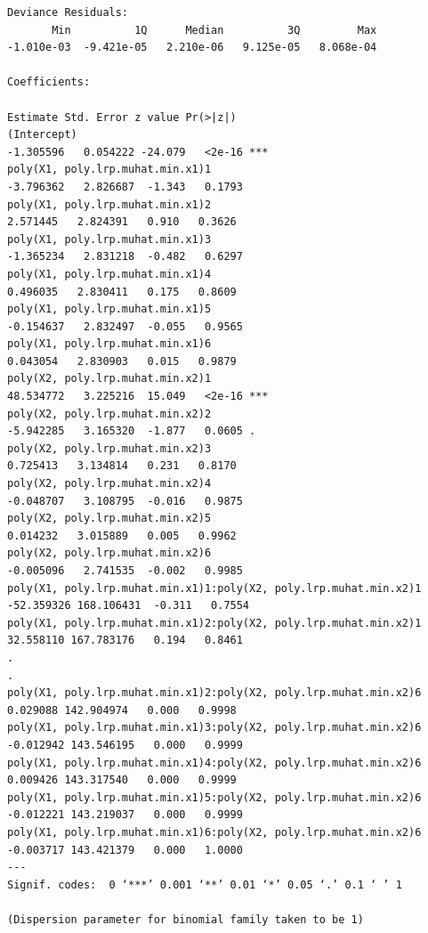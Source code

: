 \documentclass[twoside,12pt]{article}
\begin{document}
\begin{itemize}
\begin{verbatim}
Deviance Residuals: 
       Min          1Q      Median          3Q         Max  
-1.010e-03  -9.421e-05   2.210e-06   9.125e-05   8.068e-04  

Coefficients:
                                                                    Estimate Std. Error z value Pr(>|z|)    
(Intercept)                                                        -1.305596   0.054222 -24.079   <2e-16 ***
poly(X1, poly.lrp.muhat.min.x1)1                                   -3.796362   2.826687  -1.343   0.1793    
poly(X1, poly.lrp.muhat.min.x1)2                                    2.571445   2.824391   0.910   0.3626    
poly(X1, poly.lrp.muhat.min.x1)3                                   -1.365234   2.831218  -0.482   0.6297    
poly(X1, poly.lrp.muhat.min.x1)4                                    0.496035   2.830411   0.175   0.8609    
poly(X1, poly.lrp.muhat.min.x1)5                                   -0.154637   2.832497  -0.055   0.9565    
poly(X1, poly.lrp.muhat.min.x1)6                                    0.043054   2.830903   0.015   0.9879    
poly(X2, poly.lrp.muhat.min.x2)1                                   48.534772   3.225216  15.049   <2e-16 ***
poly(X2, poly.lrp.muhat.min.x2)2                                   -5.942285   3.165320  -1.877   0.0605 .  
poly(X2, poly.lrp.muhat.min.x2)3                                    0.725413   3.134814   0.231   0.8170    
poly(X2, poly.lrp.muhat.min.x2)4                                   -0.048707   3.108795  -0.016   0.9875    
poly(X2, poly.lrp.muhat.min.x2)5                                    0.014232   3.015889   0.005   0.9962    
poly(X2, poly.lrp.muhat.min.x2)6                                   -0.005096   2.741535  -0.002   0.9985    
poly(X1, poly.lrp.muhat.min.x1)1:poly(X2, poly.lrp.muhat.min.x2)1 -52.359326 168.106431  -0.311   0.7554    
poly(X1, poly.lrp.muhat.min.x1)2:poly(X2, poly.lrp.muhat.min.x2)1  32.558110 167.783176   0.194   0.8461    
.
.
poly(X1, poly.lrp.muhat.min.x1)2:poly(X2, poly.lrp.muhat.min.x2)6   0.029088 142.904974   0.000   0.9998    
poly(X1, poly.lrp.muhat.min.x1)3:poly(X2, poly.lrp.muhat.min.x2)6  -0.012942 143.546195   0.000   0.9999    
poly(X1, poly.lrp.muhat.min.x1)4:poly(X2, poly.lrp.muhat.min.x2)6   0.009426 143.317540   0.000   0.9999    
poly(X1, poly.lrp.muhat.min.x1)5:poly(X2, poly.lrp.muhat.min.x2)6  -0.012221 143.219037   0.000   0.9999    
poly(X1, poly.lrp.muhat.min.x1)6:poly(X2, poly.lrp.muhat.min.x2)6  -0.003717 143.421379   0.000   1.0000    
---
Signif. codes:  0 ‘***’ 0.001 ‘**’ 0.01 ‘*’ 0.05 ‘.’ 0.1 ‘ ’ 1

(Dispersion parameter for binomial family taken to be 1)


\end{verbatim}
\end{itemize}
\end{document}
